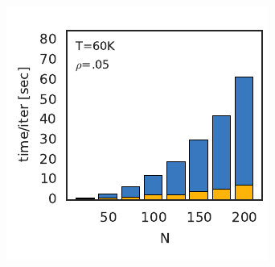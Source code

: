 \begin{figure}[t!]
\begin{subfigure}[b]{2.17in}
    \includegraphics[width=\textwidth]{figures/ch3/runtime_vs_N.pdf}
    \label{fig:runtime_vs_N}
  \end{subfigure}
  ~
  \begin{subfigure}[b]{1.27in}
    \centering
    \caption{}
    \vspace{-.25in}

\end{subfigure}
\end{figure}
